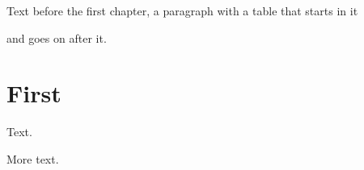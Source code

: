 \documentclass{book}
\begin{document}
\frontmatter
\listoftables
\mainmatter
Text before the first chapter, a paragraph with a table that starts in it
\begin{table}[tp]\centering\caption{Before any chapter.}\end{table}
and goes on after it.
\chapter{First}
Text.
\begin{table}[!t]\centering\caption{In the chapter.}\end{table}
More text.
\end{document}
